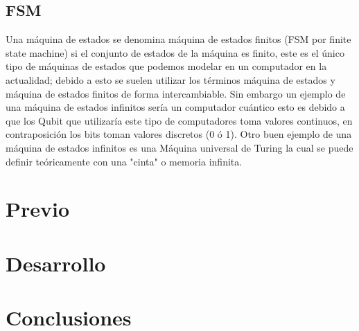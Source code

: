 \documentclass{mylib/reporteConCalif}
\begin{document}
\subsection{FSM}

Una máquina de estados se denomina máquina de estados finitos (FSM por finite state machine) si el conjunto de estados de la máquina es finito, este es el único tipo de máquinas de estados que podemos modelar en un computador en la actualidad; debido a esto se suelen utilizar los términos máquina de estados y máquina de estados finitos de forma intercambiable. Sin embargo un ejemplo de una máquina de estados infinitos sería un computador cuántico esto es debido a que los Qubit que utilizaría este tipo de computadores toma valores continuos, en contraposición los bits toman valores discretos (0 ó 1). Otro buen ejemplo de una máquina de estados infinitos es una Máquina universal de Turing la cual se puede definir teóricamente con una "cinta" o memoria infinita.


\newpage
\section{Previo}

\newpage
\section{Desarrollo}


\section{Conclusiones}
\end{document}
